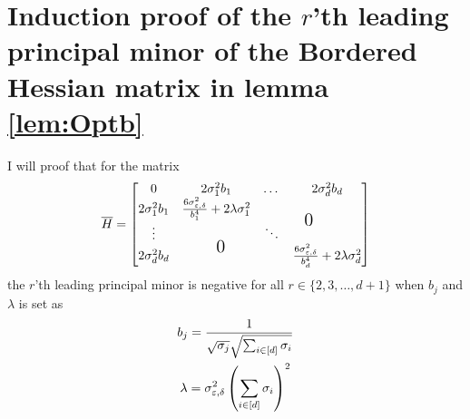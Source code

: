 \documentclass[a4paper,12pt]{article}
\begin{document}
\section{Induction proof of the $r$'th leading principal minor of the Bordered Hessian matrix in lemma \ref{lem:Optb}}
\label{apx:inducproof}
I will proof that for the matrix
\[
    \overline{H} =
    \begin{bmatrix}
    0 & 2\sigma_1^2b_1 & \dots & 2 \sigma_d^2 b_d \\
    2\sigma_1^2b_1 & \frac{6\sigma_{\epsilon, \delta}^2}{b_1^4} + 2 \lambda \sigma_1^2 &  & \multirow{2.5}{0.5in}{\Large 0}  \\
    \vdots & \multirow{2.5}{-0.5in}{\Large 0}  & \ddots \\
    2\sigma_d^2b_d &  & & \frac{6\sigma_{\epsilon, \delta}^2}{b_d^4} + 2 \lambda \sigma_d^2 
    \end{bmatrix}
\]
the $r$'th leading principal minor is negative for all $r \in \{2,3, \dots, d+1\}$
when $b_j$ and $\lambda$ is set as
\begin{gather*}
b_j = \frac{1}{\sqrt{\sigma_j} \sqrt{\sum_{i \in [d]} \sigma_i}} \\
\lambda  = \sigma_{\varepsilon,\delta}^2 \left ( \sum_{i \in [d]} \sigma_i\right)^2
\end{gather*}
\end{document}
